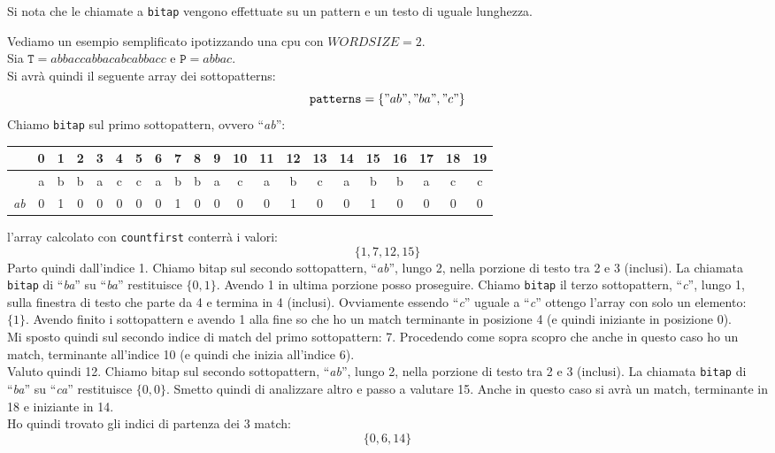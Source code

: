 \documentclass[a4paper,12pt, oneside]{article}
\begin{document}
Si nota che le chiamate a \texttt{bitap} vengono effettuate su un
pattern e un testo di uguale lunghezza.
\begin{esempio}
  Vediamo un esempio semplificato ipotizzando una cpu con
  $WORDSIZE=2$.\\
  Sia $\mathtt{T}=abbaccabbacabcabbacc$ e $\mathtt{P}=abbac$.\\
  Si avrà quindi il seguente array dei sottopatterns:
  \[\mathtt{patterns}=\{"ab", "ba", "c"\}\]
  Chiamo \texttt{bitap} sul primo sottopattern, ovvero
  ``\textit{ab}'':
  \begin{center}
    \begin{tabular}{|c|c|c|c|c|c|c|c|c|c|c|c|c|c|c|c|c|c|c|c|c|}
      \hline
      & 0 & 1 & 2 & 3 & 4 & 5 & 6 & 7 & 8 & 9 & 10 & 11 & 12 & 13 &
                                                                    14
      & 15 & 16 & 17 & 18 & 19 \\ \hline
      & a & b & b & a & c & c & a & b & b & a & c & a & b & c & a & b &
                                                                        b
                & a & c & c \\ \hline  
      \textit{ab} & 0 & 1 & 0 & 0 & 0 & 0 & 0 & 1 & 0 & 0 & 0 & 0 & 1 & 0 & 0 & 1 &
                                                                                    0
                & 0 & 0 & 0 \\ \hline
    \end{tabular}
  \end{center}
  l'array calcolato con \texttt{countfirst} conterrà i valori:
  \[\{1,7,12,15\}\]
  Parto quindi dall'indice 1. Chiamo bitap sul secondo sottopattern,
  ``\textit{ab}'', lungo 2, nella porzione di testo tra 2 e
  3 (inclusi). La chiamata \texttt{bitap} di ``\textit{ba}'' su ``\textit{ba}''
  restituisce $\{0,1\}$. Avendo 1 in ultima porzione posso proseguire.
  Chiamo \texttt{bitap} il terzo sottopattern, ``\textit{c}'', lungo
  1, sulla finestra di testo che parte da 4 e termina in 4 (inclusi). Ovviamente
  essendo ``\textit{c}'' uguale a ``\textit{c}'' ottengo l'array con
  solo un elemento: $\{1\}$. Avendo finito i sottopattern e avendo 1
  alla fine so che ho un match terminante in posizione 4 (e quindi
  iniziante in posizione 0). \\Mi sposto quindi sul secondo indice di
  match del primo sottopattern: 7. Procedendo come sopra scopro che
  anche in questo caso ho un match, terminante all'indice 10 (e quindi
  che inizia all'indice 6). \\Valuto quindi 12.  Chiamo bitap sul
  secondo sottopattern, ``\textit{ab}'', lungo 2, nella porzione di
  testo tra 2 e 3 (inclusi). La chiamata \texttt{bitap} di
  ``\textit{ba}'' su ``\textit{ca}''  restituisce $\{0,0\}$. Smetto
  quindi di analizzare altro e passo a valutare 15. Anche in questo
  caso si avrà un match, terminante in 18 e iniziante in 14.\\
  Ho quindi trovato gli indici di partenza dei 3 match:
  \[\{0,6,14\}\]
\end{esempio}
\end{document}
